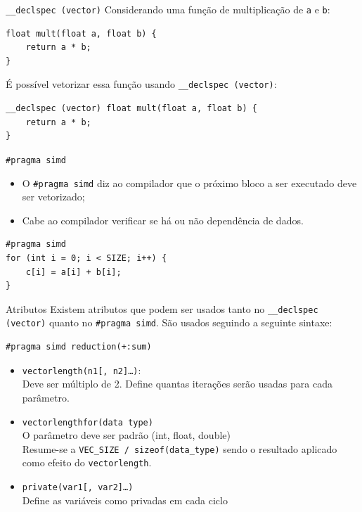 \documentclass{beamer}
\begin{document}
\begin{frame}[fragile]{\texttt{\_\_declspec (vector)}}
Considerando uma função de multiplicação de \texttt{a} e \texttt{b}:
\begin{block}{}
\begin{lstlisting}
float mult(float a, float b) {
    return a * b;
}
\end{lstlisting}
\end{block}

É possível vetorizar essa função usando \texttt{\_\_declspec (vector)}:
\begin{block}{}
\begin{lstlisting}[deletekeywords={vector}]
__declspec (vector) float mult(float a, float b) {
    return a * b;
}
\end{lstlisting}
\end{block}
\end{frame}

\begin{frame}[fragile]{\texttt{\#pragma simd}}
\begin{itemize}
    \item O \texttt{\#pragma simd} diz ao compilador que o próximo bloco a ser
    executado deve ser vetorizado;
	\item Cabe ao compilador verificar se há ou não dependência de dados.
\end{itemize}
\begin{block}{}
\begin{lstlisting}
#pragma simd
for (int i = 0; i < SIZE; i++) { 
    c[i] = a[i] + b[i]; 
}
\end{lstlisting}
\end{block}
\end{frame}


\begin{frame}[fragile]{Atributos}
Existem atributos que podem ser usados tanto no \texttt{\_\_declspec (vector)}
quanto no \texttt{\#pragma simd}. São usados seguindo a seguinte sintaxe:

\begin{lstlisting}
#pragma simd reduction(+:sum)
\end{lstlisting}

\begin{itemize}
    \item \texttt{vectorlength(n1[, n2]\ldots)}: \\
        Deve ser múltiplo de 2. Define quantas iterações serão usadas para cada
        parâmetro.
	\item \texttt{vectorlengthfor(data type)} \\
		O parâmetro deve ser padrão (int, float, double) \\
        Resume-se a \texttt{VEC\_SIZE / sizeof(data\_type)} sendo o resultado
        aplicado como efeito do \texttt{vectorlength}.
	\item \texttt{private(var1[, var2]\ldots)} \\
		Define as variáveis como privadas em cada ciclo
\end{itemize}
\end{frame}
\end{document}
